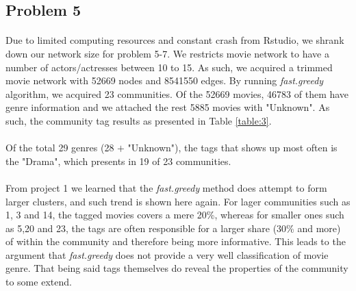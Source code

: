 \subsection*{Problem 5}
\paragraph{}
Due to limited computing resources and constant crash from Rstudio, we shrank down our network size for problem 5-7. We restricts movie network to have a number of actors/actresses between 10 to 15. As such, we acquired a trimmed movie network with 52669 nodes and 8541550 edges. By running \textit{fast.greedy} algorithm, we acquired 23 communities. Of the 52669 movies, 46783 of them have genre information and we attached the rest 5885 movies with "Unknown". As such, the community tag results as presented in Table \ref{table:3}.
\paragraph{}
Of the total 29 genres (28 $+$ "Unknown"), the tags that shows up most often is the "Drama", which presents in 19 of 23 communities.
\paragraph{}
From project 1 we learned that the \textit{fast.greedy} method does attempt to form larger clusters, and such trend is shown here again. For lager communities such as 1, 3 and 14, the tagged movies covers a mere 20\%, whereas for smaller ones such as 5,20 and 23, the tags are often responsible for a larger share (30\% and more) of within the community and therefore being more informative. This leads to the argument that \textit{fast.greedy} does not provide a very well classification of movie genre. That being said tags themselves do reveal the properties of the community to some extend.

